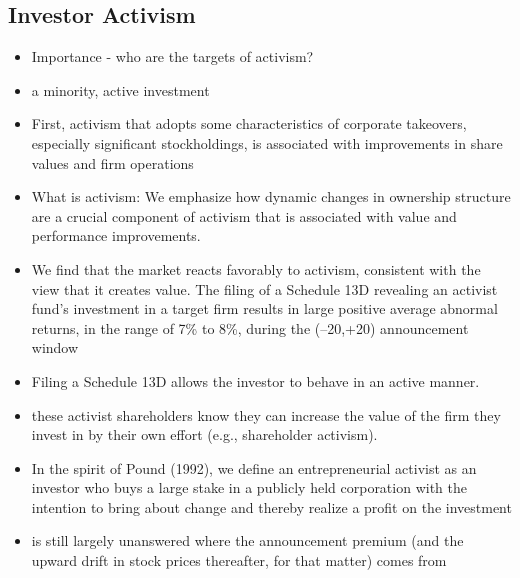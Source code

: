 \documentclass[12pt]{article}
\begin{document}
\subsection{Investor Activism}

    \begin{itemize}
        
        \item Importance - who are the targets of activism? \citep{CoffeeJr.2014}

        \item a minority, active investment \citep{Damodaran2005}
         
        \item First, activism that adopts some characteristics of corporate takeovers, especially significant stockholdings, is associated with improvements in share values and firm operations \citep{Denes2017}

        \item What is activism:  We emphasize how dynamic changes in ownership structure are a crucial component of activism that is associated with value and performance improvements.\citep{Denes2017}

        \item We find that the market reacts favorably to activism, consistent with the view that it creates value. The filing of a Schedule 13D revealing an activist fund’s investment in a target firm results in large positive average abnormal returns, in the range of 7\% to 8\%, during the (–20,+20) announcement window \citep{Brav2008}

        \item Filing a Schedule 13D allows the investor to behave in an active manner. \citep{Brigida2012}

        \item these activist shareholders know they can increase the value of the firm they invest in by their own effort (e.g., shareholder activism).\citep{Collin-Dufresne2015}

        \item In the spirit of Pound (1992), we define an entrepreneurial activist as an investor who buys a large stake in a publicly held corporation with the intention to bring about change and thereby realize a profit on the investment \citep{Klein2009}

        \item is still largely unanswered where the announcement premium (and the upward drift in stock prices thereafter, for that matter) comes from \citep{Greenwood2009}


\end{itemize}
\end{document}
